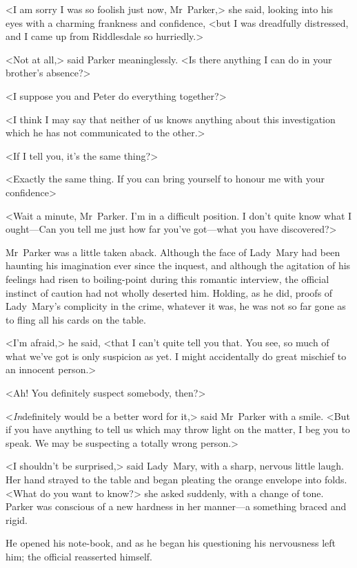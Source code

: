 <I am sorry I was so foolish just now, Mr~Parker,> she said, looking into his eyes with a charming frankness and confidence, <but I was dreadfully distressed, and I came up from Riddlesdale so hurriedly.>

<Not at all,> said Parker meaninglessly. <Is there anything I can do in your brother's absence?>

<I suppose you and Peter do everything together?>

<I think I may say that neither of us knows anything about this investigation which he has not communicated to the other.>

<If I tell you, it's the same thing?>

<Exactly the same thing. If you can bring yourself to honour me with your confidence\longdash>

<Wait a minute, Mr~Parker. I'm in a difficult position. I don't quite know what I ought—Can you tell me just how far you've got—what you have discovered?>

Mr~Parker was a little taken aback. Although the face of Lady~Mary had been haunting his imagination ever since the inquest, and although the agitation of his feelings had risen to boiling-point during this romantic interview, the official instinct of caution had not wholly deserted him. Holding, as he did, proofs of Lady~Mary's complicity in the crime, whatever it was, he was not so far gone as to fling all his cards on the table.

<I'm afraid,> he said, <that I can't quite tell you that. You see, so much of what we've got is only suspicion as yet. I might accidentally do great mischief to an innocent person.>

<Ah! You definitely suspect somebody, then?>

<\emph{In}definitely would be a better word for it,> said Mr~Parker with a smile. <But if you have anything to tell us which may throw light on the matter, I beg you to speak. We may be suspecting a totally wrong person.>

<I shouldn't be surprised,> said Lady~Mary, with a sharp, nervous little laugh. Her hand strayed to the table and began pleating the orange envelope into folds. <What do you want to know?> she asked suddenly, with a change of tone. Parker was conscious of a new hardness in her manner—a something braced and rigid.

He opened his note-book, and as he began his questioning his nervousness left him; the official reasserted himself.

